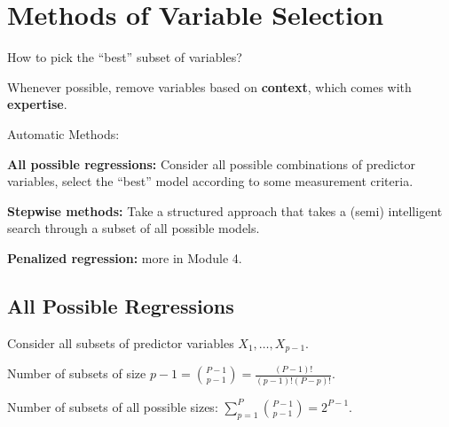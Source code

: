 \documentclass[12pt]{notes}
\begin{document}
\begin{minipage}[l][3cm][c]{\textwidth}
\end{minipage}

\section{Methods of Variable Selection}
How to pick the ``best'' subset of variables? 
\bi
\item Whenever possible, remove variables based on \textbf{context}, which comes with \textbf{expertise}.
\item Automatic Methods:
\bi
\item \textbf{All possible regressions:} Consider all possible combinations of predictor variables, select the ``best'' model according to some measurement criteria.  
\item \textbf{Stepwise methods:} Take a structured approach that takes a (semi) intelligent search through a subset of all possible models. 
\item \textbf{Penalized regression:} more in Module 4. 
\ei 
\ei

\subsection{All Possible Regressions}
Consider all subsets of predictor variables $X_1,  \ldots , X_{p-1}$. 

\bi
\item Number of subsets of size $p-1 = \binom{P-1}{p-1} = \frac{(P-1)!}{(p-1)!(P-p)!}$.
\item Number of subsets of all possible sizes: $\sum_{p=1}^P \binom{P-1}{p-1} = 2^{P-1}$.
\ei
\end{document}
